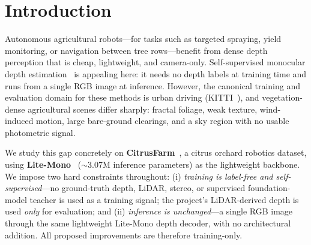 \documentclass[conference]{IEEEtran}
\begin{document}
\section{Introduction}
Autonomous agricultural robots---for tasks such as targeted spraying, yield
monitoring, or navigation between tree rows---benefit from dense depth perception
that is cheap, lightweight, and camera-only. Self-supervised monocular depth
estimation~\cite{godard2019monodepth2,zhang2023litemono} is appealing here: it
needs no depth labels at training time and runs from a single RGB image at
inference. However, the canonical training and evaluation domain for these
methods is urban driving (KITTI~\cite{geiger2013kitti}), and vegetation-dense
agricultural scenes differ sharply: fractal foliage, weak texture, wind-induced
motion, large bare-ground clearings, and a sky region with no usable
photometric signal.

We study this gap concretely on \textbf{CitrusFarm}~\cite{citrusfarm}, a citrus
orchard robotics dataset, using \textbf{Lite-Mono}~\cite{zhang2023litemono}
($\sim$3.07M inference parameters) as the lightweight backbone. We impose two
hard constraints throughout: (i) \emph{training is label-free and
self-supervised}---no ground-truth depth, LiDAR, stereo, or supervised
foundation-model teacher is used as a training signal; the project's
LiDAR-derived depth is used \emph{only} for evaluation; and (ii) \emph{inference
is unchanged}---a single RGB image through the same lightweight Lite-Mono depth
decoder, with no architectural addition. All proposed improvements are therefore
training-only.
\end{document}
